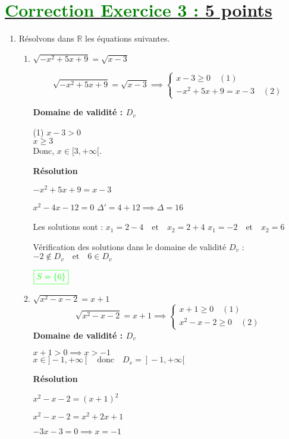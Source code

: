 \documentclass[12pt,a4paper]{article}
\begin{document}
\section*{\underline{\textcolor{green}{Correction Exercice 3 :} 5 points}}
\begin{enumerate}
    \item Résolvons dans $\mathbb{R}$ les équations suivantes.
    \begin{enumerate}
        \item $\sqrt{-x^2 + 5x + 9} = \sqrt{x - 3}$
        
\[
\sqrt{-x^2 + 5x + 9} = \sqrt{x-3}\implies
\begin{cases}
x - 3 \geq 0 \quad (1) \\
-x^2 + 5x + 9 =x-3 \quad (2)
\end{cases}
\]

\textbf{Domaine de validité : \( D_v \)}

(1) \( x - 3 > 0 \)  \\
   \(
   x \geq 3
   \)\\
   Donc, \( x \in [3, +\infty[ \).

\textbf{Résolution}
 
\(
-x^2 + 5x + 9 = x - 3
\)
 
\(
x^2 - 4x - 12 = 0
\)
\(
\Delta' = 4 + 12 \implies \Delta = 16
\)

Les solutions sont :  
\(
x_1 = 2 - 4 \quad \text{et} \quad x_2 = 2 + 4
\)
\(
x_1 = -2 \quad \text{et} \quad x_2 = 6
\)

\noindent Vérification des solutions dans le domaine de validité \( D_v \) :  
\(
-2 \notin D_v \quad \text{et} \quad 6 \in D_v
\)

\(
\textcolor{green}{\boxed{S = \{ 6 \}  }} 
\)
\item $ \sqrt{x^2 - x - 2} = x + 1$
\[
\sqrt{x^2 - x - 2} = x + 1\implies
\begin{cases}
x + 1 \geq 0 \quad (1) \\
x^2 - x - 2 \geq 0 \quad (2)
\end{cases}
\]
\textbf{Domaine de validité : \( D_v \)}

\( x + 1 > 0 \implies x > -1 \) \\  
\( x \in ]-1, +\infty[ \quad \text{donc} \quad D_v = ]-1, +\infty[ \)

\textbf{Résolution}

\( x^2 - x - 2 = (x+1)^2 \)

\( x^2 - x - 2 = x^2 + 2x + 1 \)

\( -3x - 3 = 0 \implies x = -1 \)


\end{enumerate}
\end{enumerate}
\end{document}
